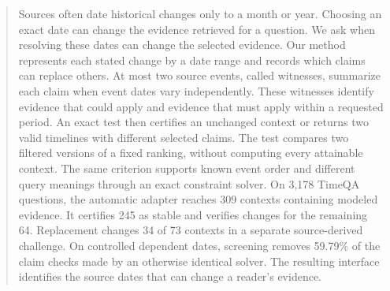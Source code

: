 \begin{abstract}
Sources often date historical changes only to a month or year.
Choosing an exact date can change the evidence retrieved for a question.
We ask when resolving these dates can change the selected evidence.
Our method represents each stated change by a date range and records which claims can replace others.
At most two source events, called witnesses, summarize each claim when event dates vary independently.
These witnesses identify evidence that could apply and evidence that must apply within a requested period.
An exact test then certifies an unchanged context or returns two valid timelines with different selected claims.
The test compares two filtered versions of a fixed ranking, without computing every attainable context.
The same criterion supports known event order and different query meanings through an exact constraint solver.
On 3,178 TimeQA questions, the automatic adapter reaches 309 contexts containing modeled evidence.
It certifies 245 as stable and verifies changes for the remaining 64.
Replacement changes 34 of 73 contexts in a separate source-derived challenge.
On controlled dependent dates, screening removes 59.79\% of the claim checks made by an otherwise identical solver.
The resulting interface identifies the source dates that can change a reader's evidence.
\end{abstract}
